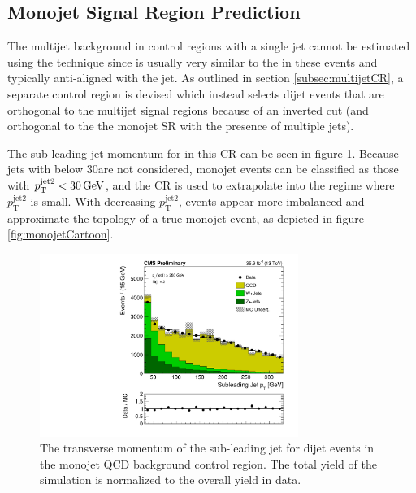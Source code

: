 \subsection{Monojet Signal Region Prediction}
\label{subsec:qcdMonojet}
The multijet background in control regions with a single jet cannot be estimated using the \dphi technique since \MET is usually very similar to the \HT in these events and typically anti-aligned with the jet. As outlined in section \ref{subsec:multijetCR}, a separate control region is devised which instead selects dijet events that are orthogonal to the multijet signal regions because of an inverted \dphilong cut (and orthogonal to the the monojet SR with the presence of multiple jets). 

The sub-leading jet momentum for in this CR can be seen in figure \ref{fig:subleadingJetPt}. Because jets with \pt below 30\GeV are not considered, monojet events can be classified as those with $p_{\mathrm{T}}^{\mathrm{jet2}} < 30\,\text{Ge\hspace{-.08em}V}$, and the CR is used to extrapolate into the regime where $p_{\mathrm{T}}^{\mathrm{jet2}}$ is small. With decreasing $p_{\mathrm{T}}^{\mathrm{jet2}}$, events appear more imbalanced and approximate the topology of a true monojet event, as depicted in figure \ref{fig:monojetCartoon}.
\begin{figure}
	\centering
	\includegraphics[width=0.75\textwidth]{backgrounds/figs/jet2_pt_35p9ifb}
	\renewcommand{\baselinestretch}{1.0}
	\caption[The transverse momentum of the sub-leading jet for dijet events in the monojet QCD background control region.]{The transverse momentum of the sub-leading jet for dijet events in the monojet QCD background control region. The total yield of the simulation is normalized to the overall yield in data.}
	\label{fig:subleadingJetPt}
\end{figure}
